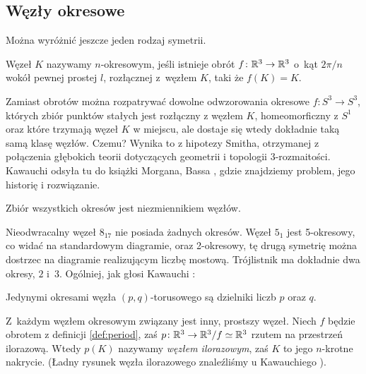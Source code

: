 
\subsection{Węzły okresowe}
%
Można wyróżnić jeszcze jeden rodzaj symetrii.

\begin{definition}
\label{def:period}%
    Węzeł $K$ nazywamy $n$-okresowym, jeśli istnieje obrót $f \colon \mathbb R^3 \to \mathbb R^3$ o~kąt $2\pi/n$ wokół pewnej prostej $l$, rozłącznej z~węzłem $K$, taki że $f(K) = K$.
\end{definition}

Zamiast obrotów można rozpatrywać dowolne odwzorowania okresowe $f \colon S^3 \to S^3$, których zbiór punktów stałych jest rozłączny z węzłem $K$, homeomorficzny z $S^1$ oraz które trzymają węzeł $K$ w miejscu, ale dostaje się wtedy dokładnie taką samą klasę węzłów.
Czemu?
Wynika to z hipotezy Smitha, otrzymanej z połączenia głębokich teorii dotyczących geometrii i topologii 3-rozmaitości.
%
Kawauchi \cite[s. 125]{kawauchi1996} odsyła tu do książki Morgana, Bassa \cite{morgan1984}, gdzie znajdziemy problem, jego historię i rozwiązanie.
%
%

\begin{proposition}
    Zbiór wszystkich okresów jest niezmiennikiem węzłów.
\end{proposition}

Nieodwracalny węzeł $8_{17}$ nie posiada żadnych okresów.
Węzeł $5_1$ jest 5-okresowy, co widać na standardowym diagramie, oraz 2-okresowy, tę drugą symetrię można dostrzec na diagramie realizującym liczbę mostową.
Trójlistnik ma dokładnie dwa okresy, $2$ i~$3$.
Ogólniej, jak głosi Kawauchi \cite[ćwiczenie 10.1.9]{kawauchi1996}:

\begin{proposition}
    Jedynymi okresami węzła $(p, q)$-torusowego są dzielniki liczb $p$ oraz $q$.
\end{proposition}

Z~każdym węzłem okresowym związany jest inny, prostszy węzeł.
Niech $f$ będzie obrotem z definicji \ref{def:period}, zaś $p \colon \mathbb R^3 \to \mathbb R^3/f \simeq \mathbb R^3$ rzutem na przestrzeń ilorazową.
%
Wtedy $p(K)$ nazywamy \emph{węzłem ilorazowym}, zaś $K$ to jego $n$-krotne nakrycie.
(Ładny rysunek węzła ilorazowego znaleźliśmy u Kawauchiego \cite[s. 122]{kawauchi1996}).

